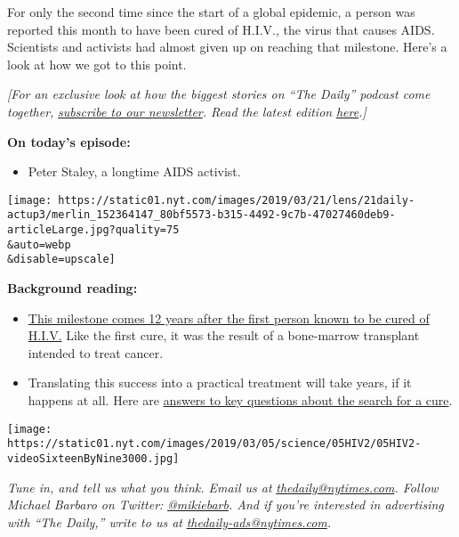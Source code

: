 For only the second time since the start of a global epidemic, a person
was reported this month to have been cured of H.I.V., the virus that
causes AIDS. Scientists and activists had almost given up on reaching
that milestone. Here's a look at how we got to this point.

\emph{{[}For an exclusive look at how the biggest stories on ``The
Daily'' podcast come together,}
\href{https://www.nytimes.com/newsletters/the-daily?module=inline}{\emph{subscribe
to our newsletter}}\emph{. Read the latest edition}
\href{https://www.nytimes.com/2019/03/15/podcasts/daily-newsletter-new-zealand-shooting-medicare-for-all.html?module=inline}{\emph{here}}\emph{.{]}}

\textbf{On today's episode:}

\begin{itemize}
\tightlist
\item
  Peter Staley, a longtime AIDS activist.
\end{itemize}

\texttt{[image: https://static01.nyt.com/images/2019/03/21/lens/21daily-actup3/merlin\_152364147\_80bf5573-b315-4492-9c7b-47027460deb9-articleLarge.jpg?quality=75\\\&auto=webp\\\&disable=upscale]}

\textbf{Background reading:}

\begin{itemize}
\item
  \href{https://www.nytimes.com/2019/03/04/health/aids-cure-london-patient.html}{This
  milestone comes 12 years after the first person known to be cured of
  H.I.V.} Like the first cure, it was the result of a bone-marrow
  transplant intended to treat cancer.
\item
  Translating this success into a practical treatment will take years,
  if it happens at all. Here are
  \href{https://www.nytimes.com/2019/03/05/health/hiv-aids-cure.html}{answers
  to key questions about the search for a cure}.
\end{itemize}

\texttt{[image: https://static01.nyt.com/images/2019/03/05/science/05HIV2/05HIV2-videoSixteenByNine3000.jpg]}

\emph{Tune in, and tell us what you think. Email us at}
\href{mailto:thedaily@nytimes.com}{\emph{thedaily@nytimes.com}}\emph{.
Follow Michael Barbaro on Twitter:}
\href{https://twitter.com/mikiebarb}{\emph{@mikiebarb}}\emph{. And if
you're interested in advertising with ``The Daily,'' write to us at}
\href{mailto:thedaily-ads@nytimes.com}{\emph{thedaily-ads@nytimes.com}}\emph{.}

